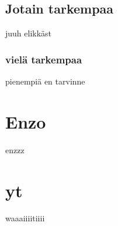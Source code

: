 \documentclass[12pt,a4paper]{article}
\begin{document}
\subsection{Jotain tarkempaa}
juuh elikkäst
\subsubsection{vielä tarkempaa}
pienempiä en tarvinne

%




\section{Enzo}
enzzz

\section{yt}
waaaiiiitiiii

\end{document}
